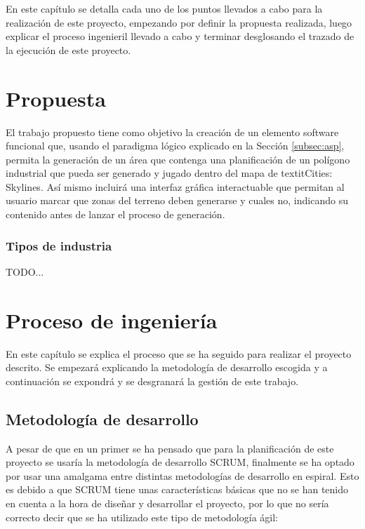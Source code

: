 En este capítulo se detalla cada uno de los puntos llevados a cabo para la realización de este proyecto, empezando por definir la propuesta realizada, luego explicar el proceso ingenieril llevado a cabo y terminar desglosando el trazado de la ejecución de este proyecto.

\section{Propuesta}

El trabajo propuesto tiene como objetivo la creación de un elemento software funcional que, usando el paradigma lógico explicado en la Sección \ref{subsec:asp}, permita la generación de un área que contenga una planificación de un polígono industrial que pueda ser generado y jugado dentro del mapa de textit{Cities: Skylines\textcopyright}. Así mismo incluirá una interfaz gráfica interactuable que permitan al usuario marcar que zonas del terreno deben generarse y cuales no, indicando su contenido antes de lanzar el proceso de generación.

\subsubsection{Tipos de industria}
\label{subsubsec:terrain}

TODO...

\section{Proceso de ingeniería}

En este capítulo se explica el proceso que se ha seguido para realizar el proyecto descrito. Se empezará explicando la metodología de desarrollo escogida y a continuación se expondrá y se desgranará la gestión de este trabajo.

\subsection{Metodología de desarrollo}
\label{subsec:metodologia}

A pesar de que en un primer se ha pensado que para la planificación de este proyecto se usaría la metodología de desarrollo SCRUM\cite{Schwaber:2001:ASD:559553}\cite{Schwaber:2004:APM:984028}, finalmente se ha optado por usar una amalgama entre distintas metodologías de desarrollo en espiral. Esto es debido a que SCRUM tiene unas características básicas que no se han tenido en cuenta a la hora de diseñar y desarrollar el proyecto, por lo que no sería correcto decir que se ha utilizado este tipo de metodología ágil:

